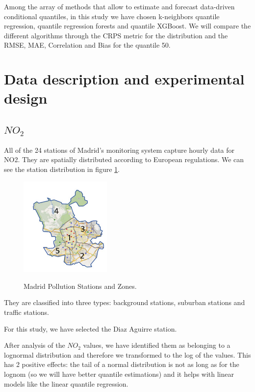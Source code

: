 \documentclass[a4paper,twocolumn,5p]{elsarticle}
\begin{document}
Among the array of methods that allow to estimate and forecast
data-driven conditional quantiles, in this study we have chosen
k-neighbors quantile regression, quantile regression forests and quantile XGBoost. 
We will compare the different algorithms through the CRPS metric for the 
distribution and the RMSE, MAE, Correlation and Bias for the quantile 50.

\section{Data description and experimental design}

\subsection{$NO_2$}
\label{sec:no2}
All of the 24 stations of Madrid’s monitoring system capture hourly data for NO2. 
They are spatially distributed according to European regulations.
We can see the station distribution in figure \ref{figure:stations}.

\begin{figure}
  \centering
      \includegraphics[width=0.4\textwidth]{zonas_madrid}
      \label{figure:stations}
  \caption{Madrid Pollution Stations and Zones.}
\end{figure} 

They are classified into 
three types: background stations, suburban stations 
and traffic stations. 

For this study, we have selected the Diaz Aguirre station.

After analysis of the $NO_2$ values, we have identified them 
as belonging to a lognormal distribution and therefore we transformed to 
the log of the values. This has 2 positive effects: the tail of a normal distribution 
is not as long as for the lognom (so we will have better quantile estimations) and 
it helps with linear models like the linear quantile regression.
\end{document}
